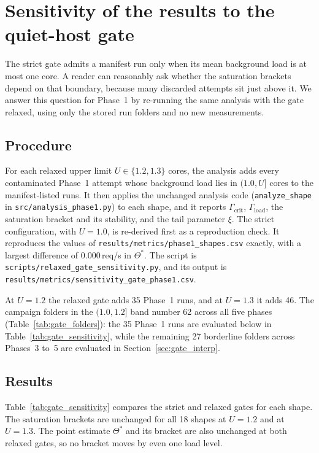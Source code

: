 \section{Sensitivity of the results to the quiet-host gate}
\label{sec:gate}

The strict gate admits a manifest run only when its mean background load is at most one core. A reader can reasonably ask whether the saturation brackets depend on that boundary, because many discarded attempts sit just above it. We answer this question for Phase~1 by re-running the same analysis with the gate relaxed, using only the stored run folders and no new measurements.

\subsection{Procedure}

For each relaxed upper limit $U\in\{1.2,1.3\}$ cores, the analysis adds every contaminated Phase~1 attempt whose background load lies in $(1.0,U]$ cores to the manifest-listed runs. It then applies the unchanged analysis code (\texttt{analyze\_shape} in \texttt{src/analysis\_phase1.py}) to each shape, and it reports $\Gamma_{\mathrm{crit}}$, $\Gamma_{\mathrm{load}}$, the saturation bracket and its stability, and the tail parameter $\xi$. The strict configuration, with $U=1.0$, is re-derived first as a reproduction check. It reproduces the values of \texttt{results/metrics/phase1\_shapes.csv} exactly, with a largest difference of $0.000$\,req/s in $\Theta^*$. The script is \texttt{scripts/relaxed\_gate\_sensitivity.py}, and its output is \texttt{results/metrics/sensitivity\_gate\_phase1.csv}.

At $U=1.2$ the relaxed gate adds 35 Phase~1 runs, and at $U=1.3$ it adds 46. The campaign folders in the $(1.0,1.2]$ band number 62 across all five phases (Table~\ref{tab:gate_folders}): the 35 Phase~1 runs are evaluated below in Table~\ref{tab:gate_sensitivity}, while the remaining 27 borderline folders across Phases~3 to~5 are evaluated in Section~\ref{sec:gate_interp}.

\subsection{Results}

Table~\ref{tab:gate_sensitivity} compares the strict and relaxed gates for each shape. The saturation brackets are unchanged for all 18 shapes at $U=1.2$ and at $U=1.3$. The point estimate $\Theta^*$ and its bracket are also unchanged at both relaxed gates, so no bracket moves by even one load level.

